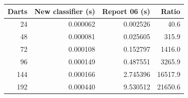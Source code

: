 \begin{tabular}{rrrr}
\hline
Darts & New classifier (s) & Report 06 (s) & Ratio \\
\hline
24 & 0.000062 & 0.002526 & 40.6 \\
48 & 0.000081 & 0.025605 & 315.9 \\
72 & 0.000108 & 0.152797 & 1416.0 \\
96 & 0.000149 & 0.487551 & 3265.9 \\
144 & 0.000166 & 2.745396 & 16517.9 \\
192 & 0.000440 & 9.530512 & 21650.6 \\
\hline
\end{tabular}
